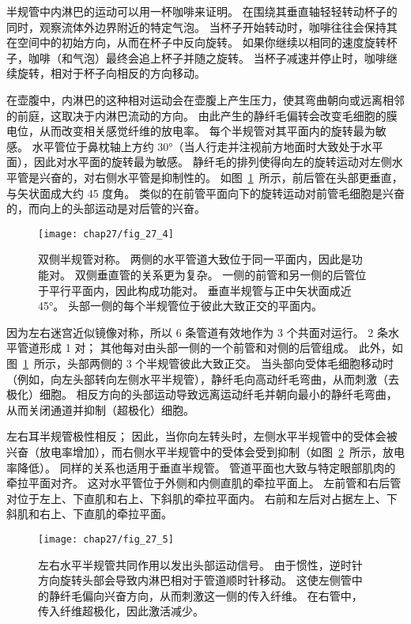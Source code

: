 半规管中内淋巴的运动可以用一杯咖啡来证明。
在围绕其垂直轴轻轻转动杯子的同时，观察流体外边界附近的特定气泡。
当杯子开始转动时，咖啡往往会保持其在空间中的初始方向，从而在杯子中反向旋转。
如果你继续以相同的速度旋转杯子，咖啡（和气泡）最终会追上杯子并随之旋转。
当杯子减速并停止时，咖啡继续旋转，相对于杯子向相反的方向移动。


在壶腹中，内淋巴的这种相对运动会在壶腹上产生压力，使其弯曲朝向或远离相邻的前庭，这取决于内淋巴流动的方向。
由此产生的静纤毛偏转会改变毛细胞的膜电位，从而改变相关感觉纤维的放电率。
每个半规管对其平面内的旋转最为敏感。
水平管位于鼻枕轴上方约 30°（当人行走并注视前方地面时大致处于水平面），因此对水平面的旋转最为敏感。
静纤毛的排列使得向左的旋转运动对左侧水平管是兴奋的，对右侧水平管是抑制性的。
如图~\ref{fig:27_4}~所示，前后管在头部更垂直，与矢状面成大约 45 度角。 
类似的在前管平面向下的旋转运动对前管毛细胞是兴奋的，而向上的头部运动是对后管的兴奋。


\begin{figure}[htbp]
	\centering
	\texttt{[image: chap27/fig\_27\_4]}
	\caption{双侧半规管对称。
		两侧的水平管道大致位于同一平面内，因此是功能对。
		双侧垂直管的关系更为复杂。
		一侧的前管和另一侧的后管位于平行平面内，因此构成功能对。
		垂直半规管与正中矢状面成近 45°。
		头部一侧的每个半规管位于彼此大致正交的平面内。}
	\label{fig:27_4}
\end{figure}


因为左右迷宫近似镜像对称，所以 6 条管道有效地作为 3 个共面对运行。
2 条水平管道形成 1 对；
其他每对由头部一侧的一个前管和对侧的后管组成。
此外，如图~\ref{fig:27_4}~所示，头部两侧的 3 个半规管彼此大致正交。
当头部向受体毛细胞移动时（例如，向左头部转向左侧水平半规管），静纤毛向高动纤毛弯曲，从而刺激（去极化）细胞。
相反方向的头部运动导致远离运动纤毛并朝向最小的静纤毛弯曲，从而关闭通道并抑制（超极化）细胞。


左右耳半规管极性相反；
因此，当你向左转头时，左侧水平半规管中的受体会被兴奋（放电率增加），而右侧水平半规管中的受体会受到抑制（如图~\ref{fig:27_5}~所示，放电率降低）。
同样的关系也适用于垂直半规管。
管道平面也大致与特定眼部肌肉的牵拉平面对齐。
这对水平管位于外侧和内侧直肌的牵拉平面上。
左前管和右后管对位于左上、下直肌和右上、下斜肌的牵拉平面内。
右前和左后对占据左上、下斜肌和右上、下直肌的牵拉平面。


\begin{figure}[htbp]
	\centering
	\texttt{[image: chap27/fig\_27\_5]}
	\caption{左右水平半规管共同作用以发出头部运动信号。
		由于惯性，逆时针方向旋转头部会导致内淋巴相对于管道顺时针移动。
		这使左侧管中的静纤毛偏向兴奋方向，从而刺激这一侧的传入纤维。
		在右管中，传入纤维超极化，因此激活减少。}
	\label{fig:27_5}
\end{figure}



